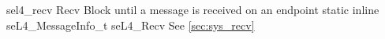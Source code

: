 %
%
%
%

\apidoc
{sel4_recv}
{Recv}
{Block until a message is received on an endpoint}
{static inline seL4\_MessageInfo\_t seL4\_Recv}
{
}
{\messageinforetdesc}
{See \autoref{sec:sys_recv}}
